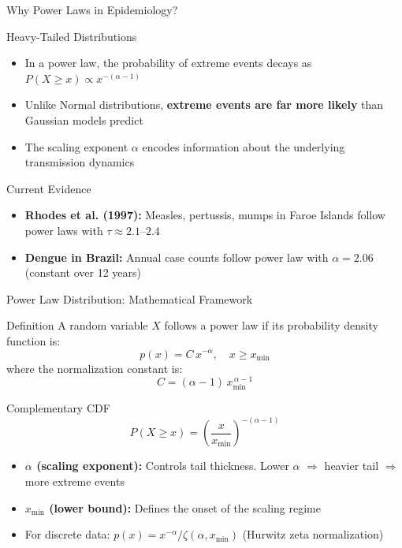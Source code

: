 \documentclass[10pt,aspectratio=169]{beamer}
\begin{document}
\begin{frame}{Why Power Laws in Epidemiology?}
\begin{block}{Heavy-Tailed Distributions}
\begin{itemize}
    \item In a power law, the probability of extreme events decays as $P(X \geq x) \propto x^{-(\alpha-1)}$
    \item Unlike Normal distributions, \textbf{extreme events are far more likely} than Gaussian models predict
    \item The scaling exponent $\alpha$ encodes information about the underlying transmission dynamics
\end{itemize}
\end{block}

\vspace{0.3cm}

\begin{block}{Current Evidence}
\begin{itemize}
    \item \textbf{Rhodes et al. (1997):} Measles, pertussis, mumps in Faroe Islands follow power laws with $\tau \approx 2.1$--$2.4$
    \item \textbf{Dengue in Brazil:} Annual case counts follow power law with $\alpha = 2.06$ (constant over 12 years)
\end{itemize}
\end{block}
\end{frame}

\begin{frame}{Power Law Distribution: Mathematical Framework}
\begin{block}{Definition}
A random variable $X$ follows a power law if its probability density function is:
$$p(x) = C \, x^{-\alpha}, \quad x \geq x_{\min}$$
where the normalization constant is:
$$C = (\alpha - 1)\, x_{\min}^{\,\alpha-1}$$
\end{block}

\vspace{0.2cm}

\begin{block}{Complementary CDF}
$$P(X \geq x) = \left(\frac{x}{x_{\min}}\right)^{-(\alpha-1)}$$
\begin{itemize}
    \item \textbf{$\alpha$ (scaling exponent):} Controls tail thickness. Lower $\alpha$ $\Rightarrow$ heavier tail $\Rightarrow$ more extreme events
    \item \textbf{$x_{\min}$ (lower bound):} Defines the onset of the scaling regime
    \item For discrete data: $p(x) = x^{-\alpha} / \zeta(\alpha, x_{\min})$ (Hurwitz zeta normalization)
\end{itemize}
\end{block}
\end{frame}
\end{document}
